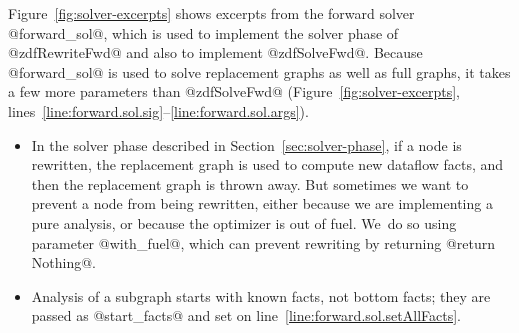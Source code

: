 \documentclass[blockstyle,preprint,natbib,nocopyrightspace]{sigplanconf}
\newcommand\lineref[1]{line~\ref{line:#1}}
\newcommand\linerangeref[2]{\mbox{lines~\ref{line:#1}--\ref{line:#2}}}
\def\authornote#1{\unskip\relax}
\newcommand{\norman}[1]{\authornote{NR: #1}}
\let\remark\norman
\newcommand\secref[1]{Section~\ref{sec:#1}}
\newcommand\figref[1]{Figure~\ref{fig:#1}}
\begin{document}
\figref{solver-excerpts} shows excerpts from the forward solver 
@forward_sol@, which is used to implement the solver phase of
@zdfRewriteFwd@ and also to implement
@zdfSolveFwd@.
Because @forward_sol@ is used to solve replacement graphs as well as
full graphs, it
takes a few more parameters than @zdfSolveFwd@
(\figref{solver-excerpts}, \linerangeref{forward.sol.sig}{forward.sol.args}).
\begin{itemize}
\item
In the solver phase described in \secref{solver-phase},
if a node is rewritten, the replacement graph is used to compute new
dataflow facts, and then the replacement graph is thrown away.
But sometimes we want to prevent a node from being rewritten,
either because
we are implementing a pure analysis, or because the optimizer
is out of fuel. 
We~do so using parameter @with_fuel@, which can prevent rewriting by
returning @return Nothing@.
\item
Analysis of a subgraph starts with known facts, not
bottom facts; they are passed as %
@start_facts@
and
 set on \lineref{forward.sol.setAllFacts}.
\end{itemize}
%
\iffalse
Function @solve@, on \linerangeref{solve.1}{solve.*} of
\figref{solver-excerpts}, 
takes an input fact, a graph, and a fuel supply; it~returns a pair
containing the exit fact and the 
remaining fuel supply.
It~also has a side effect on the state stored in the inner dataflow monad:
it brings the facts associated with labels up to a fixed point.
\fi

\remark{Need to say somewhere that @forward\_sol@ returns
@Just a@ (the exit fact) for a graph that is open at the exit and
@Nothing@ for a graph that is closed at the exit.
Any graph passed to @forward\_sol@ must be open at the entry.
}
\end{document}
